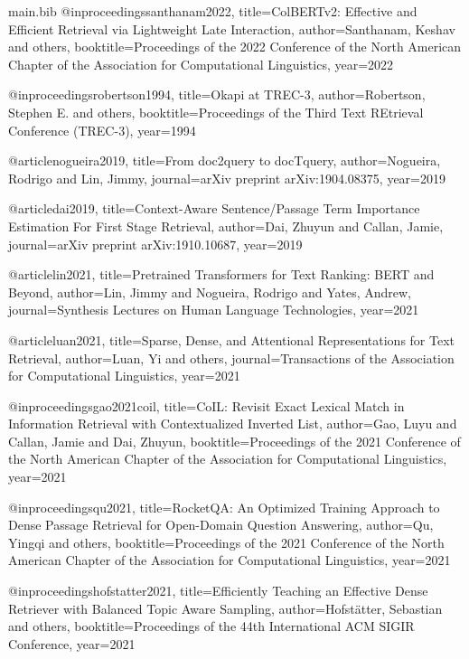 \begin{filecontents*}{main.bib}
@inproceedings{santhanam2022,
  title={ColBERTv2: Effective and Efficient Retrieval via Lightweight Late Interaction},
  author={Santhanam, Keshav and others},
  booktitle={Proceedings of the 2022 Conference of the North American Chapter of the Association for Computational Linguistics},
  year={2022}
}

@inproceedings{robertson1994,
  title={Okapi at TREC-3},
  author={Robertson, Stephen E. and others},
  booktitle={Proceedings of the Third Text REtrieval Conference (TREC-3)},
  year={1994}
}

@article{nogueira2019,
  title={From doc2query to docTquery},
  author={Nogueira, Rodrigo and Lin, Jimmy},
  journal={arXiv preprint arXiv:1904.08375},
  year={2019}
}

@article{dai2019,
  title={Context-Aware Sentence/Passage Term Importance Estimation For First Stage Retrieval},
  author={Dai, Zhuyun and Callan, Jamie},
  journal={arXiv preprint arXiv:1910.10687},
  year={2019}
}

@article{lin2021,
  title={Pretrained Transformers for Text Ranking: BERT and Beyond},
  author={Lin, Jimmy and Nogueira, Rodrigo and Yates, Andrew},
  journal={Synthesis Lectures on Human Language Technologies},
  year={2021}
}

@article{luan2021,
  title={Sparse, Dense, and Attentional Representations for Text Retrieval},
  author={Luan, Yi and others},
  journal={Transactions of the Association for Computational Linguistics},
  year={2021}
}

@inproceedings{gao2021coil,
  title={CoIL: Revisit Exact Lexical Match in Information Retrieval with Contextualized Inverted List},
  author={Gao, Luyu and Callan, Jamie and Dai, Zhuyun},
  booktitle={Proceedings of the 2021 Conference of the North American Chapter of the Association for Computational Linguistics},
  year={2021}
}

@inproceedings{qu2021,
  title={RocketQA: An Optimized Training Approach to Dense Passage Retrieval for Open-Domain Question Answering},
  author={Qu, Yingqi and others},
  booktitle={Proceedings of the 2021 Conference of the North American Chapter of the Association for Computational Linguistics},
  year={2021}
}

@inproceedings{hofstatter2021,
  title={Efficiently Teaching an Effective Dense Retriever with Balanced Topic Aware Sampling},
  author={Hofst\"{a}tter, Sebastian and others},
  booktitle={Proceedings of the 44th International ACM SIGIR Conference},
  year={2021}
}


\end{filecontents*}
